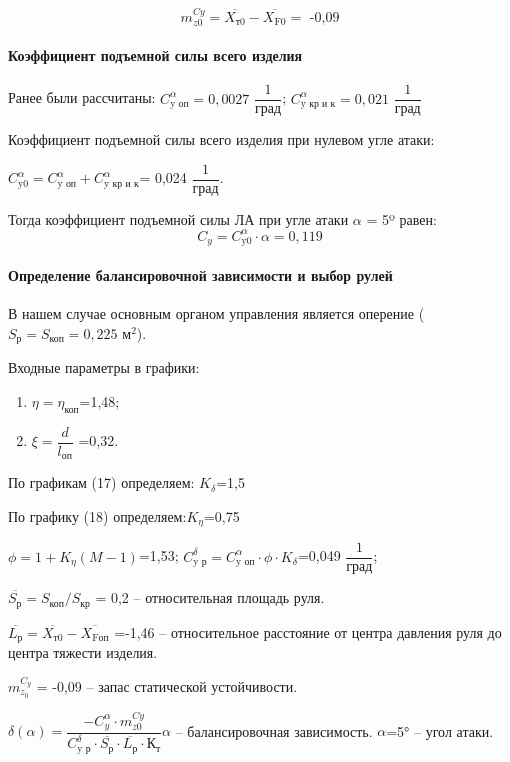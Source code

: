 $$m_{z0}^{Cy} = \overline{X_\text{т0}} - \overline{X_\text{F0}} = \text{ -0,09} $$

\paragraph{Коэффициент подъемной силы всего изделия}

Ранее были рассчитаны: $C_\text{y оп}^\alpha=0,0027$ $ \dfrac{1}{\text{град}}$;  $C_\text{y кр и к}^\alpha=0,021$ $\dfrac{1}{\text{град}}$

Коэффициент подъемной силы всего изделия при нулевом угле атаки:

$C_\text{y0}^\alpha = C_\text{y оп}^\alpha+C_\text{y кр и к}^\alpha $= 0,024  $\dfrac{1}{\text{град}}$.

Тогда коэффициент подъемной силы ЛА при угле атаки $\alpha$ = 5º равен:
$$C_y=C_\text{y0}^\alpha \cdot \alpha  = 0,119$$


\paragraph{Определение балансировочной зависимости и выбор рулей}

В нашем случае основным органом управления является оперение ($S_\text{р} = S_\text{коп} = 0,225 \text{ м}^2$).

Входные параметры в графики:
\begin{enumerate}
	\item $\eta=\eta_\text{коп} $=1,48;
	\item $\xi=\dfrac{d}{l_\text{оп}} $ =0,32.
\end{enumerate}

По графикам (17) \cite{Astakhova}  определяем: $K_\delta$=1,5

По графику (18) \cite{Astakhova}  определяем:$K_\eta$=0,75

$\phi=1+K_\eta(M-1)$=1,53;
$C_\text{y р}^\delta=C_\text{y оп}^\alpha \cdot \phi \cdot K_\delta $=0,049 $\dfrac{1}{\text{град}}$;

$\overline{S_\text{р} }=S_\text{коп}/S_\text{кр}$ = 0,2 – относительная площадь руля.

$\overline{L_\text{р} }=\overline{X_\text{т0}}-\overline{X_\text{Fоп}}$ =-1,46 – относительное расстояние от центра давления руля до центра тяжести изделия.

$m_{z_0}^{C_{y}} $ = -0,09 – запас статической устойчивости.

$ \delta(\alpha)= \dfrac{-C_y^\alpha \cdot m_{z0}^{Cy} } {C_\text{y р}^\delta \cdot \overline{S_\text{р}} \cdot \overline{L_\text{р}} \cdot К_\text{т} } \alpha $ – балансировочная зависимость.
$\alpha $=5° – угол атаки.

